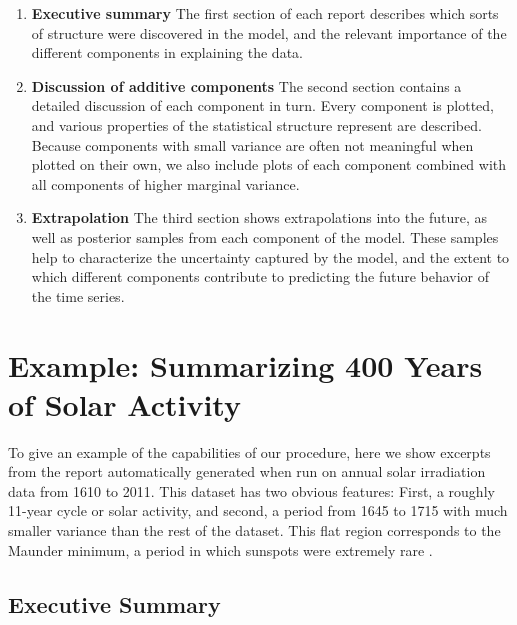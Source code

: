 \documentclass{article} %
\begin{document}
\begin{enumerate}
\item {\bf Executive summary} The first section of each report describes which sorts of structure were discovered in the model, and the relevant importance of the different components in explaining the data.
\item {\bf Discussion of additive components} The second section contains a detailed discussion of each component in turn.  Every component is plotted, and various properties of the statistical structure represent are described.  Because components with small variance are often not meaningful when plotted on their own, we also include plots of each component combined with all components of higher marginal variance.
\item {\bf Extrapolation} The third section shows extrapolations into the future, as well as posterior samples from each component of the model.  These samples help to characterize the uncertainty captured by the model, and the extent to which different components contribute to predicting the future behavior of the time series.
\end{enumerate}





\section{Example: Summarizing 400 Years of Solar Activity}
\label{sec:example}

To give an example of the capabilities of our procedure, here we show excerpts from the report automatically generated when run on annual solar irradiation data from 1610 to 2011.  This dataset has two obvious features:  First, a roughly 11-year cycle or solar activity, and second, a period from 1645 to 1715 with much smaller variance than the rest of the dataset.  This flat region corresponds to the Maunder minimum, a period in which sunspots were extremely rare \citep{lean1995reconstruction}.

\subsection{Executive Summary}
\end{document}
